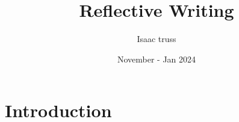 \documentclass{article}
\title{Reflective Writing}
\author{Isaac truss}
\date{November - Jan 2024}
\begin{document}
\maketitle

\tableofcontents

\newpage

\section{Introduction}
\end{document}
